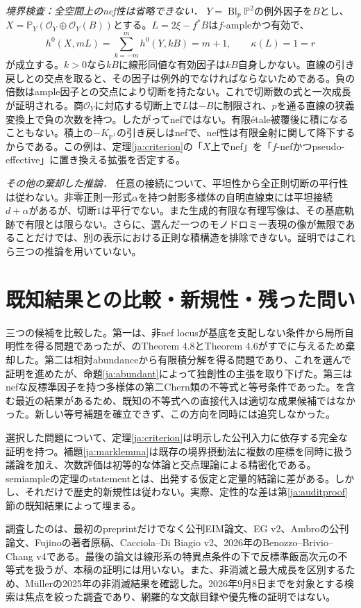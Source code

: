 \documentclass[12pt]{amsart}
\theoremstyle{definition}
\theoremstyle{remark}
\numberwithin{equation}{section}
\newcommand{\cO}{\mathcal{O}}
\newcommand{\mP}{\mathbb{P}}
\begin{document}
\textit{境界検査：全空間上のnef性は省略できない．}
$Y=\operatorname{Bl}_p\mP^2$の例外因子を$B$とし、$X=\mP_Y(\cO_Y\oplus\cO_Y(B))$とする。$L=2\xi-f^*B$は$f$-ampleかつ有効で、
\[
 h^0(X,mL)=\sum_{k=-m}^{m}h^0(Y,kB)=m+1,
 \qquad \kappa(L)=1=r
\]
が成立する。$k>0$なら$kB$に線形同値な有効因子は$kB$自身しかない。直線の引き戻しとの交点を取ると、その因子は例外的でなければならないためである。負の倍数はample因子との交点により切断を持たない。これで切断数の式と一次成長が証明される。商$\cO_Y$に対応する切断上で$L$は$-B$に制限され、$p$を通る直線の狭義変換上で負の次数を持つ。したがってnefではない。有限étale被覆後に積になることもない。積上の$-K_{\mP^1}$の引き戻しはnefで、nef性は有限全射に関して降下するからである。この例は、定理\ref{ja:criterion}の「$X$上でnef」を「$f$-nefかつpseudo-effective」に置き換える拡張を否定する。

\textit{その他の棄却した推論．}
任意の接続について、平坦性から全正則切断の平行性は従わない。非零正則一形式$\alpha$を持つ射影多様体の自明直線束には平坦接続$d+\alpha$があるが、切断$1$は平行でない。また生成的有限な有理写像は、その基底軌跡で有限とは限らない。さらに、選んだ一つのモノドロミー表現の像が無限であることだけでは、別の表示における正則な積構造を排除できない。証明ではこれら三つの推論を用いていない。

\section{既知結果との比較・新規性・残った問い}\label{ja:novelty}
三つの候補を比較した。第一は、非nef locusが基底を支配しない条件から局所自明性を得る問題であったが、\cite{ja:EIM}のTheorem 4.8とTheorem 4.6がすでに与えるため棄却した。第二は相対abundanceから有限積分解を得る問題であり、これを選んで証明を進めたが、命題\ref{ja:abundant}によって独創性の主張を取り下げた。第三はnefな反標準因子を持つ多様体の第二Chern類の不等式と等号条件であった。\cite{ja:IJZ}を含む最近の結果があるため、既知の不等式への直接代入は適切な成果候補ではなかった。新しい等号補題を確立できず、この方向を同時には追究しなかった。

選択した問題について、定理\ref{ja:criterion}は明示した公刊入力に依存する完全な証明を持つ。補題\ref{ja:marklemma}は既存の境界摂動法に複数の座標を同時に扱う議論を加え、次数評価は初等的な体論と交点理論による精密化である。semiampleの定理のstatementとは、出発する仮定と定量的結論に差がある。しかし、それだけで歴史的新規性は従わない。実際、定性的な差は第\ref{ja:auditproof}節の既知結果によって埋まる。

調査したのは、最初のpreprintだけでなく公刊EIM論文、EG v2、Ambroの公刊論文、Fujinoの著者原稿、Cacciola--Di Biagio v2、2026年のBenozzo--Brivio--Chang v4\cite{ja:BBC}である。最後の論文は線形系の特異点条件の下で反標準飯高次元の不等式を扱うが、本稿の証明には用いない。また、非消滅と最大成長を区別するため、M\"ullerの2025年の非消滅結果\cite{ja:Mu}を確認した。2026年9月8日までを対象とする検索は焦点を絞った調査であり、網羅的な文献目録や優先権の証明ではない。
\end{document}
